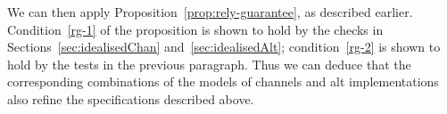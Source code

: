 %

We can then apply Proposition~\ref{prop:rely-guarantee}, as described
earlier. 
Condition~\ref{rg-1} of the proposition is shown to hold by the checks in
Sections~\ref{sec:idealisedChan} and~\ref{sec:idealisedAlt};
condition~\ref{rg-2} is shown to hold by the tests in the previous paragraph.
Thus we can deduce that the corresponding combinations of the models of
channels and alt implementations also refine the specifications described
above.


